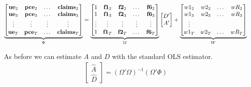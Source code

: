 \documentclass[11pt, letterpaper]{article}\usepackage[]{graphicx}\usepackage[]{color}
\newcommand{\vv}[1]{\textcolor{black}{\mathbf{#1}}}
\begin{document}
\begin{equation}
\underbrace{\begin{bmatrix}
\vv{ue}_{2} & \vv{pce}_{2} & \dots & \vv{claims}_{2}\\
\vv{ue}_{3} & \vv{pce}_{3} & \dots & \vv{claims}_{3}\\
\vdots & \vdots & \vdots & \vdots \\
\vv{ue}_{T} & \vv{pce}_{T} & \dots & \vv{claims}_{T}\\
\end{bmatrix}}_{\Phi}
=
\underbrace{\begin{bmatrix}
1 & \vv{f1}_{2} & \vv{f2}_{2} & \dots & \vv{f6}_{2}\\
1 & \vv{f1}_{3} & \vv{f2}_{3} & \dots & \vv{f6}_{3}\\
\vdots & \vdots & \vdots & \vdots & \vdots \\
1 & \vv{f1}_{T} & \vv{f2}_{T} & \dots & \vv{f6}_{T}\\
\end{bmatrix}}_{\Omega}
\begin{bmatrix}
D'\\
A'
\end{bmatrix}
 +
\underbrace{\begin{bmatrix}
w1_2 & w2_2 & \dots & wR_2\\
w1_3 & w2_3 & \dots & wR_3\\
\vdots\\
w1_T & w2_T & \dots & wR_T\\
\end{bmatrix}}_{W}
\end{equation}

As before we can estimate $A$ and $D$ with the standard OLS estimator.
\begin{align*}
\begin{bmatrix}
	\widehat{A}\\
	\widehat{D}
\end{bmatrix} =
(\Omega' \Omega)^{-1} (\Omega'\Phi)
\end{align*}
\end{document}
